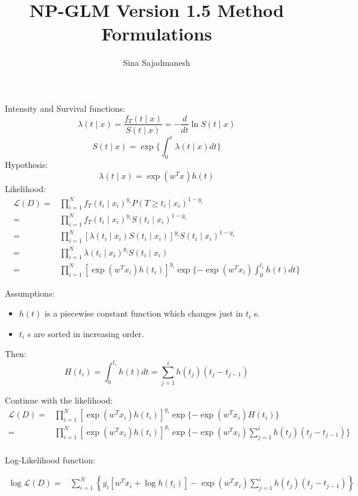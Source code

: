 \documentclass[]{article}
\title{NP-GLM Version 1.5 Method Formulations}
\author{Sina Sajadmanesh}
\begin{document}
\maketitle

Intensity and Survival functions:
\[\lambda(t\mid x)=\frac{f_T(t\mid x)}{S(t\mid x)}=-\frac{d}{dt}\ln S(t\mid x) \]
\[S(t\mid x)=\exp\{\int_{0}^{t}\lambda(t\mid x)dt\}\]
Hypothesis: 
\[\lambda(t\mid x)=\exp(w^Tx)h(t)\]
Likelihood:
\begin{equation*}
\begin{split}
\mathcal{L}(D)=&\prod_{i=1}^{N}f_T(t_i\mid x_i)^{y_i}P(T\ge t_i\mid x_i)^{1-y_i}\\
=&\prod_{i=1}^{N}f_T(t_i\mid x_i)^{y_i}S(t_i\mid x_i)^{1-y_i}\\
=&\prod_{i=1}^{N}[\lambda(t_i\mid x_i)S(t_i\mid x_i)]^{y_i}S(t_i\mid x_i)^{1-y_i}\\
=&\prod_{i=1}^{N}\lambda(t_i\mid x_i)^{y_i}S(t_i\mid x_i)\\
=&\prod_{i=1}^{N}\left[\exp(w^Tx_i)h(t_i)\right]^{y_i}\exp\lbrace-\exp(w^Tx_i)\int_{0}^{t_i}h(t)dt\rbrace
\end{split}
\end{equation*}

Assumptions:
\begin{itemize}
\item $h(t)$ is a piecewise constant function which changes just in $t_i$ s.
\item $t_i$ s are sorted in increasing order.
\end{itemize}

Then:
\[H(t_i)=\int_{0}^{t_i}h(t)dt = \sum_{j=1}^{i}h(t_j)(t_j-t_{j-1})\]

Continue with the likelihood:
\begin{equation*}
\begin{split}
\mathcal{L}(D)
=&\prod_{i=1}^{N}\left[\exp(w^Tx_i)h(t_i)\right]^{y_i}\exp\lbrace-\exp(w^Tx_i)H(t_i)\rbrace\\
=&\prod_{i=1}^{N}\left[\exp(w^Tx_i)h(t_i)\right]^{y_i}\exp\lbrace-\exp(w^Tx_i)\sum_{j=1}^{i}h(t_j)(t_j-t_{j-1})\rbrace\\
\end{split}
\end{equation*}

Log-Likelihood function:

\begin{equation*}
\begin{split}
\log\mathcal{L}(D)
=&\sum_{i=1}^{N}\left\lbrace y_i\left[w^Tx_i + \log h(t_i)\right]-\exp(w^Tx_i)\sum_{j=1}^{i}h(t_j)(t_j-t_{j-1})\right\rbrace\\
\end{split}
\end{equation*}
\end{document}

